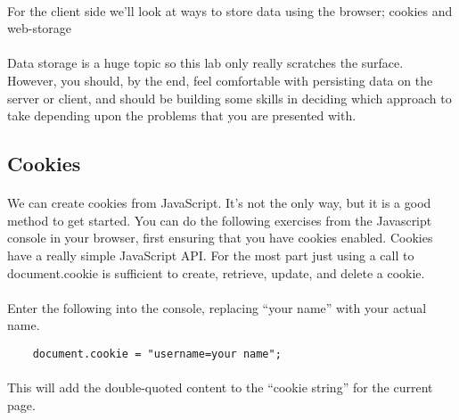 \documentclass[10pt, a4paper]{article}
\begin{document}
\paragraph{} For the client side we'll look at ways to store data using the browser; cookies and web-storage%


\paragraph{} Data storage is a huge topic so this lab only really scratches the surface. However, you should, by the end, feel comfortable with persisting data on the server or client, and should be building some skills in deciding which approach to take depending upon the problems that you are presented with.

\subsection*{Cookies}
\paragraph{} We can create cookies from JavaScript. It's not the only way, but it is a good method to get started. You can do the following exercises from the Javascript console in your browser, first ensuring that you have cookies enabled. Cookies have a really simple JavaScript API. For the most part just using a call to document.cookie is sufficient to create, retrieve, update, and delete a cookie.

\paragraph{} Enter the following into the console, replacing ``your name'' with your actual name.
\begin{lstlisting}
    document.cookie = "username=your name";
\end{lstlisting}
\paragraph{} This will add the double-quoted content to the ``cookie string'' for the current page.
\end{document}
